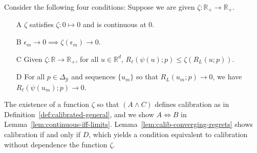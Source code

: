 \documentclass{article}
\newcommand{\reals}{\mathbb{R}}
\newcommand{\simplex}{\Delta_\Y}
\newcommand{\Y}{\mathcal{Y}}
\begin{document}
Consider the following four conditions: Suppose we are given $\zeta:\reals_+ \to \reals_+$.
\begin{enumerate}
	\item [A] $\zeta$ satisfies $\zeta : 0 \mapsto 0$ and is continuous at $0$.
	\item [B] $\epsilon_m \to 0 \implies \zeta(\epsilon_m) \to 0$.
	\item [C] Given $\zeta:\reals \to \reals_+$, for all $u \in \reals^d$, $R_\ell(\psi(u); p) \leq \zeta(R_L(u;p))$.
	\item [D] For all $p \in \simplex$ and sequences $\{u_m\}$ so that $R_L(u_m; p) \to 0$, we have $R_\ell(\psi(u_m); p) \to 0$.
\end{enumerate}
The existence of a function $\zeta$ so that $(A \wedge C)$ defines calibration as in Definition~\ref{def:calibrated-general}, and we show $A \iff B$ in Lemma~\ref{lem:continuous-iff-limits}.  
Lemma~\ref{lem:calib-converging-regrets} shows calibration if and only if $D$, which yields a condition equivalent to calibration without dependence the function $\zeta$.
\end{document}
